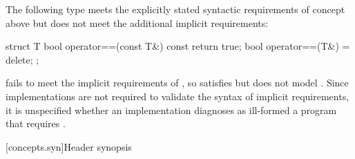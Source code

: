 \pnum
\begin{example}
The following type  meets the explicitly stated syntactic requirements
of concept  above but does not meet the additional implicit
requirements:
\begin{codeblock}
struct T {
  bool operator==(const T&) const { return true; }
  bool operator==(T&) = delete;
};
\end{codeblock}

 fails to meet the implicit requirements of ,
so  satisfies but does not model .
Since implementations are not required to validate the syntax
of implicit requirements, it is unspecified whether an implementation diagnoses
as ill-formed a program that requires .
\end{example}

[concepts.syn]{Header  synopsis}

